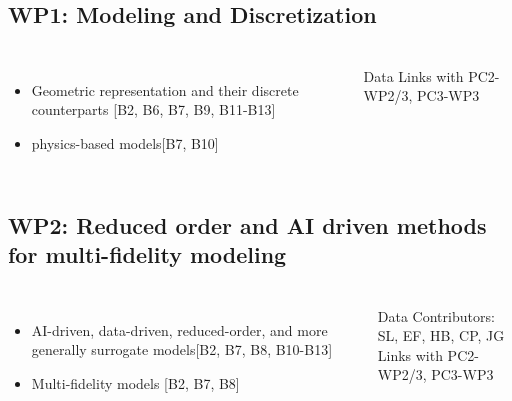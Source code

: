 \subsection{WP1: Modeling and Discretization}
\begin{frame}
  \frametitle{\insertsectionhead}
  \framesubtitle{\insertsubsectionhead}

  \begin{columns}
    \begin{itemize}
      \item Geometric representation and their discrete counterparts [B2, B6, B7, B9, B11-B13] 
\
      \item physics-based models[B7, B10] 
    \end{itemize}
  
  \begin{alertblock}{Data }
    Links with PC2-WP2/3, PC3-WP3 

  \end{alertblock}

  \end{columns}
\end{frame}


\subsection{WP2: Reduced order and AI driven methods for multi-fidelity modeling} 
\begin{frame}
  \frametitle{\insertsectionhead}
  \framesubtitle{\insertsubsectionhead}

  \begin{columns}
    \begin{itemize}
      \item AI-driven, data-driven, reduced-order, and more generally surrogate models[B2, B7, B8, B10-B13]
      \item Multi-fidelity models [B2, B7, B8]
    \end{itemize}
  
    \begin{alertblock}{Data}
    Contributors: SL, EF, HB, CP, JG\\
    Links with PC2-WP2/3, PC3-WP3
  \end{alertblock}

  \end{columns}
\end{frame}

